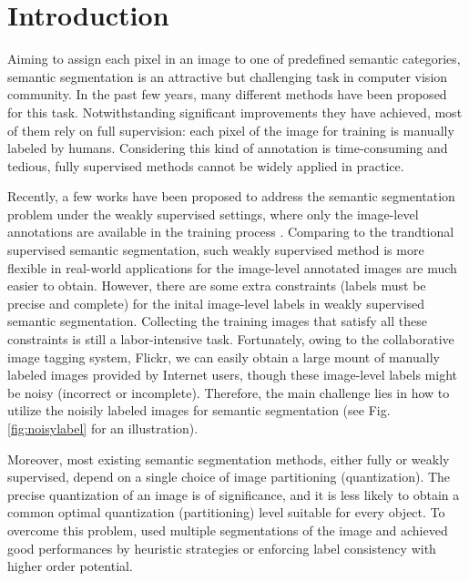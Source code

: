 \section{Introduction}
Aiming to assign each pixel in an image to one of predefined semantic categories, semantic segmentation is an attractive but challenging task in computer vision community. In the past few years, many different methods \cite{csurka2011efficient,gonfaus2010harmony,ladicky2009associative,nowozin2010parameter,shotton2008semantic,shotton2006textonboost,singh2013nonparametric,verbeek2007scene,yang2007multiple,yao2012describing} have been proposed for this task. Notwithstanding significant improvements they have achieved, most of them rely on full supervision: each pixel of the image for training is manually labeled by humans. Considering this kind of annotation is time-consuming and tedious, fully supervised methods cannot be widely applied in practice.

Recently, a few works have been proposed to address the semantic segmentation problem under the weakly supervised settings, where only the image-level annotations are available in the training process \cite{verbeek2007region,vezhnevets2010towards,vezhnevets2011weakly,vezhnevets2012weakly,xu2014tell,zhang2013sparse}. Comparing to the trandtional supervised semantic segmentation, such weakly supervised method is more flexible in real-world applications for the image-level annotated images are much easier to obtain. However, there are some extra constraints (\eg labels must be precise and complete) for the inital image-level labels in weakly supervised semantic segmentation. Collecting the training images that satisfy all these constraints is still a labor-intensive task. Fortunately, owing to the collaborative image tagging system, \eg Flickr, we can easily obtain a large mount of manually labeled images provided by Internet users, though these image-level labels might be noisy (incorrect or incomplete). Therefore, the main challenge lies in how to utilize the noisily labeled images for semantic segmentation (see Fig. \ref{fig:noisylabel} for an illustration). 

Moreover, most existing semantic segmentation methods, either fully or weakly supervised, depend on a single choice of image partitioning (quantization). The precise quantization of an image is of significance, and it is less likely to obtain a common optimal quantization (partitioning) level suitable for every object. To overcome this problem, \cite{hoiem2005geometric,kohli2009robust,ladicky2009associative,nowozin2010parameter,russell2006using} used multiple segmentations of the image and achieved good performances by heuristic strategies or enforcing label consistency with higher order potential.

